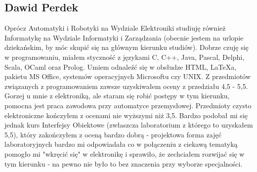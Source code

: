 \subsection{Dawid Perdek}
Oprócz Automatyki i Robotyki na Wydziale Elektroniki studiuję również Informatykę na Wydziale Informatyki i Zarządzania (obecnie jestem na urlopie dziekańskim, by móc skupić się na głównym kierunku studiów). Dobrze czuję się w programowaniu, miałem styczność z językami C, C++, Java, Pascal, Delphi, Scala, OCaml oraz Prolog. Umiem odnaleźć się w obsłudze HTML, LaTeXa, pakietu MS Office, systemów operacyjnych Microsoftu czy UNIX. Z przedmiotów związanych z programowaniem zawsze uzyskiwałem oceny z przedziału 4,5 - 5,5. Gorzej u mnie z elektroniką, ale staram się robić postępy w tym kierunku, pomocna jest praca zawodowa przy automatyce przemysłowej. Przedmioty czysto elektroniczne kończyłem z ocenami nie wyższymi niż 3,5. Bardzo podobał mi się jednak kurs Interfejsy Obiektowe (zwłaszcza laboratorium z którego to uzyskałem 5,5), który zakończyłem z oceną bardzo dobrą - projektowa forma zajęć laboratoryjnych bardzo mi odpowiadała co w połączeniu z ciekawą tematyką pomogło mi "wkręcić się" w elektronikę i sprawiło, że zechciałem rozwijać się w tym kierunku - na pewno nie było to bez znaczenia przy wyborze specjalności.
